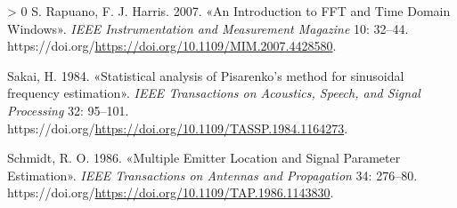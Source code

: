 \documentclass[
  italian,
]{article}
\newlength{\cslhangindent}
\newenvironment{CSLReferences}[3] %
 {%
  \setlength{\parindent}{0pt}
  \ifodd #1 \everypar{\setlength{\hangindent}{\cslhangindent}}\ignorespaces\fi
  \ifnum #2 > 0
  \setlength{\parskip}{#3\baselineskip}
  \fi
 }%
 {}
\begin{document}
\begin{CSLReferences}{1}{0}
\leavevmode\hypertarget{ref-fft-time-domain-window}{}%
S. Rapuano, F. J. Harris. 2007. {«An Introduction to FFT and Time Domain
Windows»}. \emph{{IEEE} Instrumentation and Measurement Magazine} 10:
32--44. https://doi.org/\url{https://doi.org/10.1109/MIM.2007.4428580}.

\leavevmode\hypertarget{ref-pisarenko-stat-analysis}{}%
Sakai, H. 1984. {«Statistical analysis of Pisarenko's method for
sinusoidal frequency estimation»}. \emph{{IEEE} Transactions on
Acoustics, Speech, and Signal Processing} 32: 95--101.
https://doi.org/\url{https://doi.org/10.1109/TASSP.1984.1164273}.

\leavevmode\hypertarget{ref-multiple-emitter-location}{}%
Schmidt, R. O. 1986. {«Multiple Emitter Location and Signal Parameter
Estimation»}. \emph{{IEEE} Transactions on Antennas and Propagation} 34:
276--80. https://doi.org/\url{https://doi.org/10.1109/TAP.1986.1143830}.

\end{CSLReferences}
\end{document}
